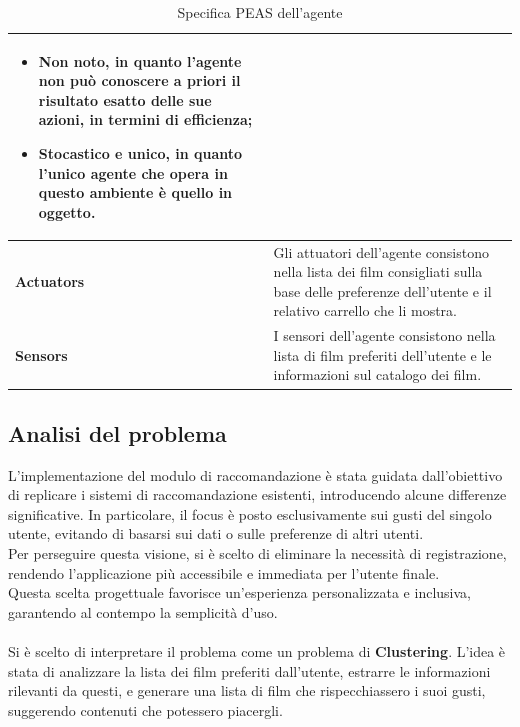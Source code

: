 \documentclass[a4paper,12pt]{article}
\begin{document}
\begin{table}[h!]
\begin{tabularx}{\textwidth}{|>{\columncolor[HTML]{CFE2F3}}l|X|}
\begin{itemize}
                              \item \textbf{Non noto}, in quanto l’agente non può conoscere a priori il risultato esatto delle sue azioni, in termini di efficienza;
                              \item \textbf{Stocastico e unico}, in quanto l’unico agente che opera in questo ambiente è quello in oggetto.
                            \end{itemize}            
                                                \\ \hline
        \textbf{Actuators}         & Gli attuatori dell’agente consistono nella lista dei film consigliati sulla base delle preferenze dell'utente e il relativo carrello che li mostra.                                                                                                                                                                                  					\\ \hline
        \textbf{Sensors}           & I sensori dell’agente consistono nella lista di film preferiti dell'utente e le informazioni sul catalogo dei film.                                                                                                                                                                                                      					\\ \hline
    \end{tabularx}
    \caption{Specifica PEAS dell'agente}
\end{table}

   \newpage
    \subsection{Analisi del problema}
	L'implementazione del modulo di raccomandazione è stata guidata dall'obiettivo di replicare i sistemi di raccomandazione esistenti, introducendo alcune differenze significative. In particolare, il focus è posto esclusivamente sui gusti del singolo utente, evitando di basarsi sui dati o sulle preferenze di altri utenti.\\ Per perseguire questa visione, si è scelto di eliminare la necessità di registrazione, rendendo l'applicazione più accessibile e immediata per l'utente finale.\\Questa scelta progettuale favorisce un'esperienza personalizzata e inclusiva, garantendo al contempo la semplicità d'uso. \\ \\
	Si è scelto di interpretare il problema come un problema di \textbf{Clustering}. L'idea è stata di analizzare la lista dei film preferiti dall'utente, estrarre le informazioni rilevanti da questi, e generare una lista di film che rispecchiassero i suoi gusti, suggerendo contenuti che potessero piacergli.
\end{document}

